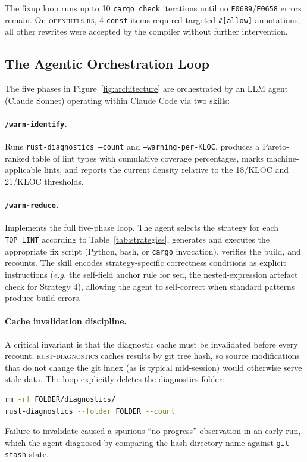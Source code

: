 \documentclass[sigconf,review,anonymous]{acmart}
\newcommand{\rd}{\textsc{rust-diagnostics}\xspace}
\newcommand{\eg}{\textit{e.g.}\xspace}
\begin{document}
The fixup loop runs up to 10 \texttt{cargo check} iterations until no
\texttt{E0689}/\texttt{E0658} errors remain.
On \textsc{openhitls-rs}, 4 \texttt{const} items required targeted
\texttt{\#[allow]} annotations; all other rewrites were accepted by the
compiler without further intervention.

\subsection{The Agentic Orchestration Loop}\label{sec:agent}

The five phases in Figure~\ref{fig:architecture} are orchestrated by an LLM
agent (Claude Sonnet) operating within Claude Code via two skills:

\paragraph{\texttt{/warn-identify}.}
Runs \texttt{rust-diagnostics --count} and \texttt{--warning-per-KLOC},
produces a Pareto-ranked table of lint types with cumulative coverage
percentages, marks machine-applicable lints, and reports the current density
relative to the 18/KLOC and 21/KLOC thresholds.

\paragraph{\texttt{/warn-reduce}.}
Implements the full five-phase loop.
The agent selects the strategy for each \texttt{TOP\_LINT} according to
Table~\ref{tab:strategies}, generates and executes the appropriate fix
script (Python, bash, or \texttt{cargo} invocation), verifies the build,
and recounts.
The skill encodes strategy-specific correctness conditions as explicit
instructions (\eg the self-field anchor rule for sed, the nested-expression
artefact check for Strategy 4), allowing the agent to self-correct when
standard patterns produce build errors.

\paragraph{Cache invalidation discipline.}
A critical invariant is that the diagnostic cache must be invalidated before
every recount.
\rd caches results by git tree hash, so source modifications that do not
change the git index (as is typical mid-session) would otherwise serve stale
data.
The loop explicitly deletes the diagnostics folder:
\begin{lstlisting}[language=bash]
rm -rf FOLDER/diagnostics/
rust-diagnostics --folder FOLDER --count
\end{lstlisting}
Failure to invalidate caused a spurious ``no progress'' observation in an
early run, which the agent diagnosed by comparing the hash directory name
against \texttt{git stash} state.
\end{document}
